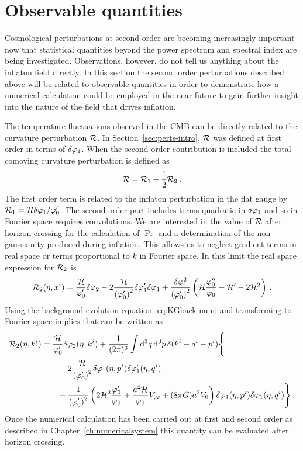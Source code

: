\section{Observable quantities}
\label{sec:observable-perts}

Cosmological perturbations at second order are becoming increasingly important now
that
statistical quantities beyond the power spectrum and spectral index are being
investigated. Observations, however, do not tell us anything about the inflaton
field directly. In this section the second order perturbations described above will
be related to observable quantities in order to demonstrate how a numerical
calculation could
be employed in the near future to gain further insight into the nature of the field
that drives inflation.
% 

The temperature fluctuations observed in the CMB can
be directly related to the curvature perturbation $\mathcal{R}$. In
Section~\ref{sec:perts-intro}, $\mathcal{R}$ was defined at first order in terms of $\delta\varphi_{1}$.
When the second order contribution is included the total comoving curvature
perturbation is defined as
% 
\begin{equation}
\label{eq:Rfulldefn-perts}
 \mathcal{R} = \mathcal{R}_1 + \frac{1}{2}\mathcal{R}_2\,.
\end{equation}
% 
The first order term is related to the inflaton perturbation in the flat gauge by
$\mathcal{R}_1
= \mathcal{H}\delta\varphi_{1}/\varphi_0'$. The second order part includes terms quadratic in $\delta\varphi_{1}$ and so
in Fourier space requires convolutions. We are interested in the value of $\mathcal{R}$ after
horizon crossing for the calculation of $\Pr$ and a determination of the
non-gaussianity produced during inflation. This allows us to neglect gradient terms
in real space or terms proportional to $k$ in Fourier space.
In this limit the real space expression for $\mathcal{R}_2$ is \cite{Malik:2005cy}
% 
\begin{equation}
 \label{eq:R2real-perts}
\mathcal{R}_2(\eta, x^i) = \frac{\mathcal{H}}{\varphi_0'}\delta\varphi_{2} - 2\frac{\mathcal{H}}{\left(\varphi_0'\right)^2}
\delta\varphi_{1}'\delta\varphi_{1} + \frac{\delta\varphi_{1}^2}{\left(\varphi_0'\right)^2}\left(\mathcal{H}\frac{\varphi_0''}{\varphi_0} 
 - \mathcal{H}' -2\mathcal{H}^2 \right)\,.
\end{equation}
% 
Using the background evolution equation \eqref{eq:KGback-num} and transforming to
Fourier space implies that  can be written as
% 
\begin{align}
 \R_2(\eta, \kvi) &= \frac{\H}{\vp_0'}\dvp2(\eta, \kvi) 
  + \frac{1}{(2\pi)^3}\int \d^3q\, \d^3p\, \delta(\kvi-\qvi-\pvi) \Bigg\{
\nonumber\\
% 
 &\qquad -2\frac{\H}{\left(\vp_0'\right)^2} \dvp1(\eta, \pvi)\dvp1'(\eta, \qvi) \nonumber\\
%  
&\qquad -\frac{1}{\left(\vp_0'\right)^2} \left(
  2\H^2 \frac{\vp_0'}{\vp_0} + \frac{a^2 \H}{\vp_0}\Uphi + (8\pi G)a^2 \U
 \right)
\dvp1(\eta,\pvi) \dvp1(\eta, \qvi)\Bigg\}\,.
\end{align}
% 
Once the numerical calculation has been carried out at first and second order as
described in Chapter~\ref{ch:numericalsystem} this quantity can be evaluated after
horizon crossing.

